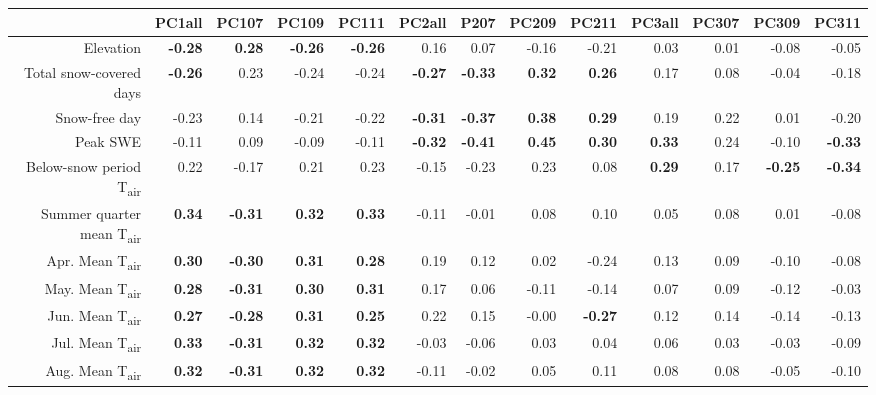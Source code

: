 \begin{table}[ht]
\centering
\begin{tabular}{rrrrrrrrrrrrr}
  \hline
 & PC1all & PC107 & PC109 & PC111 & PC2all & P207 & PC209 & PC211 & PC3all & PC307 & PC309 & PC311 \\ 
  \hline
Elevation & \textbf{ -0.28 } & \textbf{ 0.28 } & \textbf{ -0.26 } & \textbf{ -0.26 } & 0.16 & 0.07 & -0.16 & -0.21 & 0.03 & 0.01 & -0.08 & -0.05 \\ 
  Total snow-covered days & \textbf{ -0.26 } & 0.23 & -0.24 & -0.24 & \textbf{ -0.27 } & \textbf{ -0.33 } & \textbf{ 0.32 } & \textbf{ 0.26 } & 0.17 & 0.08 & -0.04 & -0.18 \\ 
  Snow-free day & -0.23 & 0.14 & -0.21 & -0.22 & \textbf{ -0.31 } & \textbf{ -0.37 } & \textbf{ 0.38 } & \textbf{ 0.29 } & 0.19 & 0.22 & 0.01 & -0.20 \\ 
  Peak SWE & -0.11 & 0.09 & -0.09 & -0.11 & \textbf{ -0.32 } & \textbf{ -0.41 } & \textbf{ 0.45 } & \textbf{ 0.30 } & \textbf{ 0.33 } & 0.24 & -0.10 & \textbf{ -0.33 } \\ 
  Below-snow period T\textsubscript{air} & 0.22 & -0.17 & 0.21 & 0.23 & -0.15 & -0.23 & 0.23 & 0.08 & \textbf{ 0.29 } & 0.17 & \textbf{ -0.25 } & \textbf{ -0.34 } \\ 
  Summer quarter mean T\textsubscript{air} & \textbf{ 0.34 } & \textbf{ -0.31 } & \textbf{ 0.32 } & \textbf{ 0.33 } & -0.11 & -0.01 & 0.08 & 0.10 & 0.05 & 0.08 & 0.01 & -0.08 \\ 
  Apr. Mean T\textsubscript{air} & \textbf{ 0.30 } & \textbf{ -0.30 } & \textbf{ 0.31 } & \textbf{ 0.28 } & 0.19 & 0.12 & 0.02 & -0.24 & 0.13 & 0.09 & -0.10 & -0.08 \\ 
  May. Mean T\textsubscript{air} & \textbf{ 0.28 } & \textbf{ -0.31 } & \textbf{ 0.30 } & \textbf{ 0.31 } & 0.17 & 0.06 & -0.11 & -0.14 & 0.07 & 0.09 & -0.12 & -0.03 \\ 
  Jun. Mean T\textsubscript{air} & \textbf{ 0.27 } & \textbf{ -0.28 } & \textbf{ 0.31 } & \textbf{ 0.25 } & 0.22 & 0.15 & -0.00 & \textbf{ -0.27 } & 0.12 & 0.14 & -0.14 & -0.13 \\ 
  Jul. Mean T\textsubscript{air} & \textbf{ 0.33 } & \textbf{ -0.31 } & \textbf{ 0.32 } & \textbf{ 0.32 } & -0.03 & -0.06 & 0.03 & 0.04 & 0.06 & 0.03 & -0.03 & -0.09 \\ 
  Aug. Mean T\textsubscript{air} & \textbf{ 0.32 } & \textbf{ -0.31 } & \textbf{ 0.32 } & \textbf{ 0.32 } & -0.11 & -0.02 & 0.05 & 0.11 & 0.08 & 0.08 & -0.05 & -0.10 \\ 

\end{tabular}
\end{table}

